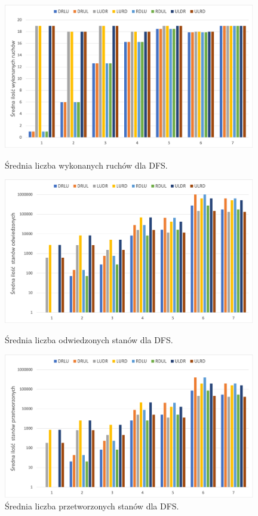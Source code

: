 \documentclass{classrep}
\begin{document}
\begin{figure}
	\includegraphics[width=11cm]{DFS/DFS_śr_ruchów}
	\centering
	\captionsetup{name=Wykres}
	\caption{Średnia liczba wykonanych ruchów dla DFS.}
		
	\includegraphics[width=11cm]{DFS/DFS_odwiedzone}
	\centering
	\captionsetup{name=Wykres}
	\caption{Średnia liczba odwiedzonych stanów dla DFS.}
	
	\includegraphics[width=11cm]{DFS/DFS_przetworzone}
	\centering
	\captionsetup{name=Wykres}
	\caption{Średnia liczba przetworzonych stanów dla DFS.}
\end{figure}
\end{document}
